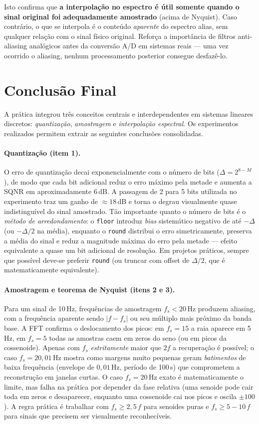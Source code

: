 \documentclass[12pt]{article}
\begin{document}
Isto confirma que \textbf{a interpolação no espectro é útil somente quando o sinal original foi adequadamente amostrado} (acima de Nyquist). Caso contrário, o que se interpola é o conteúdo \emph{aparente} do espectro alias, sem qualquer relação com o sinal físico original. Reforça a importância de filtros anti-aliasing analógicos antes da conversão A/D em sistemas reais — uma vez ocorrido o aliasing, nenhum processamento posterior consegue desfazê-lo.

\clearpage
\section{Conclusão Final}

A prática integrou três conceitos centrais e interdependentes em sistemas lineares discretos: \emph{quantização}, \emph{amostragem} e \emph{interpolação espectral}. Os experimentos realizados permitem extrair as seguintes conclusões consolidadas.

\paragraph{Quantização (item 1).} O erro de quantização decai exponencialmente com o número de bits ($\Delta = 2^{8-M}$), de modo que cada bit adicional reduz o erro máximo pela metade e aumenta a SQNR em aproximadamente $6$\,dB. A passagem de 2 para 5 bits utilizada no experimento traz um ganho de $\approx 18$\,dB e torna o degrau visualmente quase indistinguível do sinal amostrado. Tão importante quanto o número de bits é o \emph{método de arredondamento}: o \texttt{floor} introduz \textit{bias} sistemático negativo de até $-\Delta$ (ou $-\Delta/2$ na média), enquanto o \texttt{round} distribui o erro simetricamente, preserva a média do sinal e reduz a magnitude máxima do erro pela metade — efeito equivalente a quase um bit adicional de resolução. Em projetos práticos, sempre que possível deve-se preferir \texttt{round} (ou truncar com offset de $\Delta/2$, que é matematicamente equivalente).

\paragraph{Amostragem e teorema de Nyquist (itens 2 e 3).} Para um sinal de 10\,Hz, frequências de amostragem $f_s < 20$\,Hz produzem aliasing, com a frequência aparente sendo $|f - f_s|$ ou seu múltiplo mais próximo da banda base. A FFT confirma o deslocamento dos picos: em $f_s=15$ a raia aparece em 5\,Hz, em $f_s=5$ todas as amostras caem em zeros do seno (ou em picos da cossenoide). Apenas com $f_s$ \emph{estritamente} maior que $2f$ a recuperação é possível; o caso $f_s=20{,}01$\,Hz mostra como margens muito pequenas geram \emph{batimentos} de baixa frequência (envelope de $0{,}01$\,Hz, período de 100\,s) que comprometem a reconstrução em janelas curtas. O caso $f_s=20$\,Hz exato é matematicamente o limite, mas falha na prática por depender da fase relativa (uma senoide pode cair toda em zeros e desaparecer, enquanto uma cossenoide cai nos picos e oscila $\pm 100$). A regra prática é trabalhar com $f_s \geq 2{,}5\,f$ para senoides puras e $f_s \geq 5{-}10\,f$ para sinais que precisem ser visualmente reconhecíveis.
\end{document}

